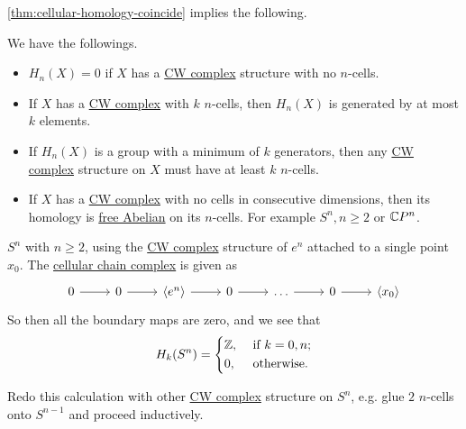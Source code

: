 \autoref{thm:cellular-homology-coincide} implies the following.
\begin{corollary}
	We have the followings.
	\begin{itemize}
		\item \(H_n(X) = 0\) if \(X\) has a \hyperref[def:CW-Complex]{CW complex} structure with no \(n\)-cells.
		\item If \(X\) has a \hyperref[def:CW-Complex]{CW complex} with \(k\) \(n\)-cells, then \(H_n(X)\) is generated by at most \(k\) elements.
		\item If \(H_n(X)\) is a group with a minimum of \(k\) generators, then any \hyperref[def:CW-Complex]{CW complex} structure on \(X\) must have at least \(k\) \(n\)-cells.
		\item If \(X\) has a \hyperref[def:CW-Complex]{CW complex} with no cells in consecutive dimensions, then its homology is
		      \hyperref[def:free-Abelian-group]{free Abelian} on its \(n\)-cells. For example \(S^n, n \geq 2\) or \(\mathbb{\MakeUppercase{c}} P^n\).
	\end{itemize}
\end{corollary}

\begin{eg}
	\(S^n\) with \(n \geq 2\), using the \hyperref[def:CW-Complex]{CW complex} structure of \(e^n\) attached to a single point \(x_0\). The \hyperref[def:cellular-chain-complex]{cellular chain complex} is given as
	\[
		\begin{tikzcd}
			0 & 0 & {\left<e^n\right>} & 0 & \ldots & 0 & {\left<x_0\right>}
			\arrow[from=1-1, to=1-2]
			\arrow[from=1-2, to=1-3]
			\arrow[from=1-3, to=1-4]
			\arrow[from=1-4, to=1-5]
			\arrow[from=1-5, to=1-6]
			\arrow[from=1-6, to=1-7]
		\end{tikzcd}
	\]
	So then all the boundary maps are zero, and we see that
	\[
		H_k(S^n) = \begin{dcases}
			\mathbb{\MakeUppercase{z}}, & \text{ if } k=0, n ; \\
			0,                          & \text{ otherwise}.
		\end{dcases}
	\]
\end{eg}

\begin{exercise}
	Redo this calculation with other \hyperref[def:CW-Complex]{CW complex} structure on \(S^n\), e.g. glue \(2\) \(n\)-cells onto \(S^{n - 1}\) and proceed inductively.
\end{exercise}

